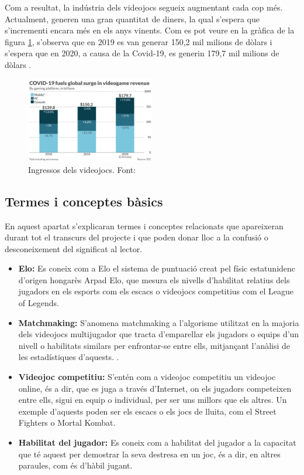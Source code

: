 \documentclass[a4paper]{article}
\begin{document}
Com a resultat, la indústria dels videojocs segueix augmentant cada cop més. Actualment, generen una gran quantitat de diners, la qual s'espera que s'incrementi encara més en els anys vinents. Com es pot veure en la gràfica de la figura \ref{fig:VideogamesRevenuesImage}, s'observa que en 2019 es van generar 150,2 mil milions de dòlars i s'espera que en 2020, a causa de la Covid-19, es generin 179,7 mil milions de dòlars \cite{VidogamesMoreMoney}. 

\begin{figure}[H]
    \centering
    \includegraphics[width=0.5\textwidth]{images/videogamesMoney.jpeg}
    \caption{Ingressos dels videojocs. Font: \cite{VidogamesMoreMoney}}
    \label{fig:VideogamesRevenuesImage}
\end{figure}

\subsection{Termes i conceptes bàsics}
En aquest apartat s'explicaran termes i conceptes relacionats que apareixeran durant tot el transcurs del projecte i que poden donar lloc a la confusió o desconeixement del significat al lector.

\begin{itemize}
\item \textbf{Elo:} Es coneix com a Elo el sistema de puntuació creat pel físic estatunidenc d'origen hongarès Arpad Elo, que mesura els nivells d'habilitat relatius dels jugadors en els esports com els escacs o videojocs competitius com el League of Legends. \cite{wikipediaElo}

\item \textbf{Matchmaking:} S'anomena matchmaking a l'algorisme utilitzat en la majoria dels videojocs multijugador que tracta d'emparellar els jugadors o equips d'un nivell o habilitats similars per enfrontar-se entre ells, mitjançant l'anàlisi de les estadístiques d'aquests. \cite{matchmakingDef}.

\item \textbf{Videojoc competitiu:} S'entén com a videojoc competitiu un videojoc online, és a dir, que es juga a través d'Internet, on els jugadors competeixen entre ells, sigui en equip o individual, per ser uns millors que els altres. Un exemple d'aquests poden ser els escacs o els jocs de lluita, com el Street Fighters o Mortal Kombat.

\item \textbf{Habilitat del jugador:} Es coneix com a habilitat del jugador a la capacitat que té aquest per demostrar la seva destresa en un joc, és a dir, en altres paraules, com és d'hàbil jugant.
\end{itemize}
\end{document}
